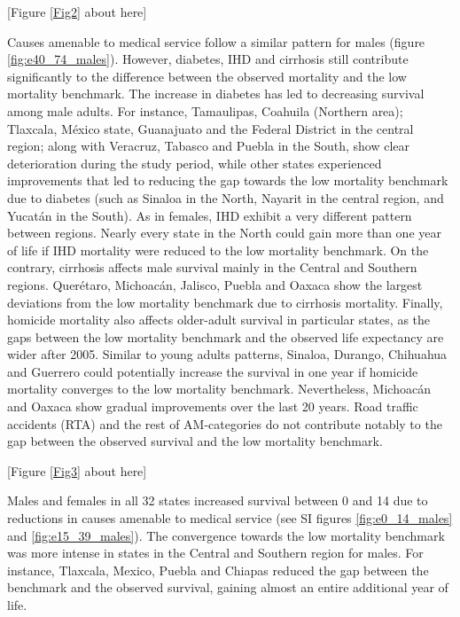 \documentclass{bmcart}
\begin{document}
\begin{center}
[Figure \ref{Fig2} about here]
\end{center}


Causes amenable to medical service follow a similar pattern for males (figure  \ref{fig:e40_74_males}). However, diabetes, IHD and cirrhosis still contribute significantly to the difference between the observed mortality and the low mortality benchmark. The increase in diabetes has led to decreasing survival among male adults. For instance,  Tamaulipas, Coahuila (Northern area); Tlaxcala, M\'exico state, Guanajuato and the Federal District in the central region; along with Veracruz, Tabasco and Puebla in the South, show clear deterioration during the study period, while other states experienced improvements that led to reducing the gap towards the low mortality benchmark due to diabetes (such as Sinaloa in the North, Nayarit in the central region, and Yucat\'an in the South). As in females, IHD exhibit a very different pattern between regions. Nearly every state in the North could gain more than one year of life if IHD mortality were reduced to the low mortality benchmark. On the contrary, cirrhosis affects male survival mainly in the Central and Southern regions. Quer\'etaro, Michoac\'an, Jalisco, Puebla and Oaxaca show the largest deviations from the low mortality benchmark due to cirrhosis mortality. Finally, homicide mortality also affects older-adult survival in particular states, as the gaps between the low mortality benchmark and the observed life expectancy are wider after 2005. Similar to young adults patterns, Sinaloa, Durango, Chihuahua and Guerrero could potentially increase the survival in one year if homicide mortality converges to the low mortality benchmark. Nevertheless,  Michoac\'an and Oaxaca show gradual improvements over the last 20 years. Road traffic accidents (RTA) and the rest of AM-categories do not contribute notably to the gap between the observed survival and the low mortality benchmark. \\

\begin{center}
[Figure \ref{Fig3} about here]
\end{center}


Males and females in all 32 states increased survival between 0 and 14 due to reductions in causes amenable to medical service (see SI figures  \ref{fig:e0_14_males} and \ref{fig:e15_39_males}). The convergence towards the low mortality benchmark was more intense in states in the Central and Southern region for males. For instance, Tlaxcala, Mexico, Puebla and Chiapas reduced the gap between the benchmark and the observed survival, gaining almost an entire additional year of life. 
\end{document}
